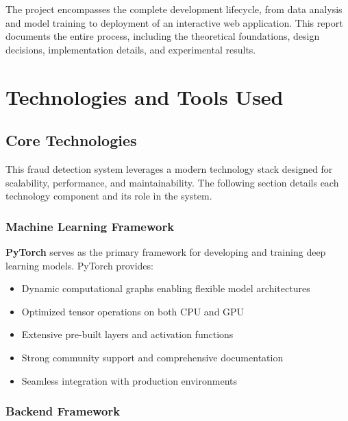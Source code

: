 \documentclass[12pt,a4paper,twoside]{report}
\begin{document}
The project encompasses the complete development lifecycle, from data analysis and model training to deployment of an interactive web application. This report documents the entire process, including the theoretical foundations, design decisions, implementation details, and experimental results.

\chapter*{Technologies and Tools Used}

\section*{Core Technologies}

This fraud detection system leverages a modern technology stack designed for scalability, performance, and maintainability. The following section details each technology component and its role in the system.

\subsection*{Machine Learning Framework}

\textbf{PyTorch} serves as the primary framework for developing and training deep learning models. PyTorch provides:

\begin{itemize}
    \item Dynamic computational graphs enabling flexible model architectures
    \item Optimized tensor operations on both CPU and GPU
    \item Extensive pre-built layers and activation functions
    \item Strong community support and comprehensive documentation
    \item Seamless integration with production environments
\end{itemize}

\subsection*{Backend Framework}
\end{document}
